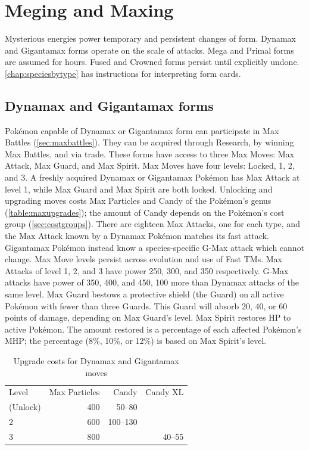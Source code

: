 \chapter{Meging and Maxing\label{chap:megmax}}
Mysterious energies power temporary and persistent changes of form.
Dynamax and Gigantamax forms operate on the scale of attacks.
Mega and Primal forms are assumed for hours.
Fused and Crowned forms persist until explicitly undone.
\autoref{chap:speciesbytype} has instructions for interpreting form cards.

\section{Dynamax and Gigantamax forms\label{sec:dmaxgmax}}
Pokémon capable of Dynamax or Gigantamax form can participate in Max Battles (\autoref{sec:maxbattles}).
They can be acquired through Research, by winning Max Battles, and via trade.
These forms have access to three Max Moves: Max Attack, Max Guard, and Max Spirit.
Max Moves have four levels: Locked, 1, 2, and 3.
A freshly acquired Dynamax or Gigantamax Pokémon has Max Attack at level 1, while Max Guard and Max Spirit are both locked.
Unlocking and upgrading moves costs Max Particles and Candy of the Pokémon's genus (\autoref{table:maxupgrades});
 the amount of Candy depends on the Pokémon's cost group (\autoref{sec:costgroups}).
There are eighteen Max Attacks, one for each type, and the Max Attack known by a Dynamax Pokémon matches its fast attack.
Gigantamax Pokémon instead know a species-specific G-Max attack which cannot change.
Max Move levels persist across evolution and use of Fast TMs.
Max Attacks of level 1, 2, and 3 have power 250, 300, and 350
  respectively.
G-Max attacks have power of 350, 400, and 450, 100 more than Dynamax attacks of the same level.
Max Guard bestows a protective shield (the Guard) on all active Pokémon
  with fewer than three Guards.
This Guard will absorb 20, 40, or 60 points of damage, depending on Max Guard's level.
Max Spirit restores HP to active Pokémon.
The amount restored is a percentage of each affected Pokémon's MHP\@;
  the percentage (8\%, 10\%, or 12\%) is based on Max Spirit's level.
\begin{table}
\centering
\begin{tabular}{lrrr}
Level & Max Particles & Candy & Candy XL\\
\Midrule
1 (Unlock) & 400 & 50--80 &\\
2          & 600 & 100--130 &\\
3          & 800 & & 40--55\\
\end{tabular}
\caption{Upgrade costs for Dynamax and Gigantamax moves\label{table:maxupgrades}}
\end{table}

